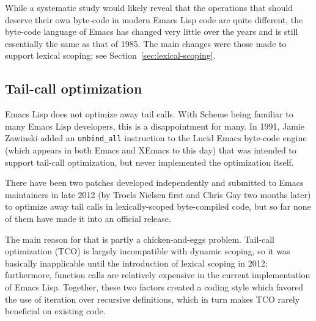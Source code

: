 \documentclass[format=acmsmall, review]{acmart}
\newcommand \Elisp {Emacs Lisp}
\begin{document}
While a systematic study would likely reveal that the operations that should
deserve their own byte-code in modern \Elisp{} code are quite different, the
byte-code language of Emacs has changed very little over the years and is
still essentially the same as that of 1985.  The main changes were
those made to support lexical scoping; see Section~\ref{sec:lexical-scoping}.

\subsection{Tail-call optimization}
\label{sec:tco}

\Elisp{} does not optimize away tail calls.  With Scheme being familiar to
many \Elisp{} developers, this is a disappointment for many.
In 1991, Jamie Zawinski added an \texttt{unbind\_all} instruction to
the Lucid Emacs byte-code engine (which appears in both Emacs and
XEmacs to this day) that was intended to support tail-call optimization,
but never implemented the optimization itself.

There have been two patches developed independently and submitted to Emacs
maintainers in late 2012 (by Troels Nielsen first and Chris Gay two months
later) to optimize away tail calls in lexically-scoped byte-compiled code,
but so far none of them have made it into an official release.

The main reason for that is partly a chicken-and-eggs problem.  Tail-call
optimization (TCO) is largely incompatible with dynamic scoping, so it was
basically inapplicable until the introduction of lexical scoping in 2012;
furthermore, function calls are relatively expensive in the current
implementation of \Elisp{}.  Together, these two factors created a coding
style which favored the use of iteration over recursive definitions, which
in turn makes TCO rarely beneficial on existing code.
\end{document}
